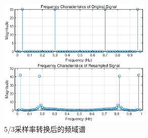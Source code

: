 \begin{figure}[htbp]
  \centering
  \includegraphics[width=0.65\textwidth]{figure/exp1/fig6.eps}
  \caption{5/3采样率转换后的频域谱}
  \label{fig:fig6}
\end{figure}